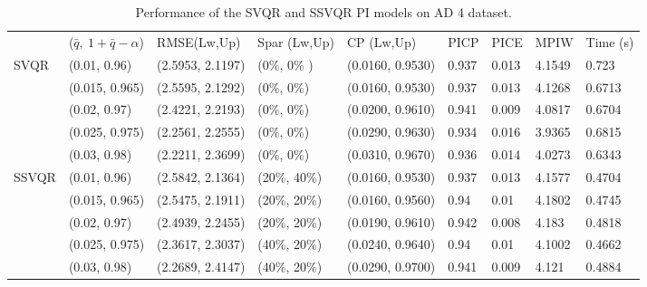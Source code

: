 \documentclass[10pt]{article} %
\begin{document}
\begin{table}
    {\fontsize{9}{9}\selectfont \begin{tabular}{|l|l|l|l|l|l|l|l|l|}
\cline{1-9}
        & ($\bar{q},~1+\bar{q}-\alpha$)               & RMSE(Lw,Up)   & Spar (Lw,Up)     & CP (Lw,Up)     & PICP  & PICE & MPIW   & Time (s) \\ \cline{1-9} 
\multirow{5}{*}{SVQR} & 
        (0.01, 0.96) & (2.5953, 2.1197) & (0\%, 0\% )& (0.0160, 0.9530) & 0.937 & 0.013 & 4.1549 & 0.723 \\ 
         & (0.015, 0.965) & (2.5595, 2.1292) & (0\%, 0\%) & (0.0160, 0.9530) & 0.937 & 0.013 & 4.1268 & 0.6713 \\ 
       & (0.02, 0.97) & (2.4221, 2.2193) & (0\%, 0\%) & (0.0200, 0.9610) & 0.941 & 0.009 & 4.0817 & 0.6704 \\ 
       & (0.025, 0.975) & (2.2561, 2.2555) & (0\%, 0\%) & (0.0290, 0.9630) & 0.934 & 0.016 & 3.9365 & 0.6815 \\ 
       & (0.03, 0.98) & (2.2211, 2.3699) & (0\%, 0\%) & (0.0310, 0.9670) & 0.936 & 0.014 & 4.0273 & 0.6343 \\ \hline
    \multirow{5}{*}{SSVQR}   &  (0.01, 0.96) & (2.5842, 2.1364) & (20\%, 40\%) & (0.0160, 0.9530) & 0.937 & 0.013 & 4.1577 & 0.4704 \\
       & (0.015, 0.965) & (2.5475, 2.1911) & (20\%, 20\%) & (0.0160, 0.9560) & 0.94 & 0.01 & 4.1802 & 0.4745 \\ 
       & (0.02, 0.97) & (2.4939, 2.2455) & (20\%, 20\%) & (0.0190, 0.9610) & 0.942 & 0.008 & 4.183 & 0.4818 \\ 
       & (0.025, 0.975) & (2.3617, 2.3037) & (40\%, 20\%) & (0.0240, 0.9640) & 0.94 & 0.01 & 4.1002 & 0.4662 \\ 
       & (0.03, 0.98) & (2.2689, 2.4147) & (40\%, 20\%) & (0.0290, 0.9700) & 0.941 & 0.009 & 4.121 & 0.4884 \\ \hline
    \end{tabular}}
   \caption{Performance of the SVQR and SSVQR PI models on AD 4 dataset.}
\label{AD4}
\end{table}
\end{document}
